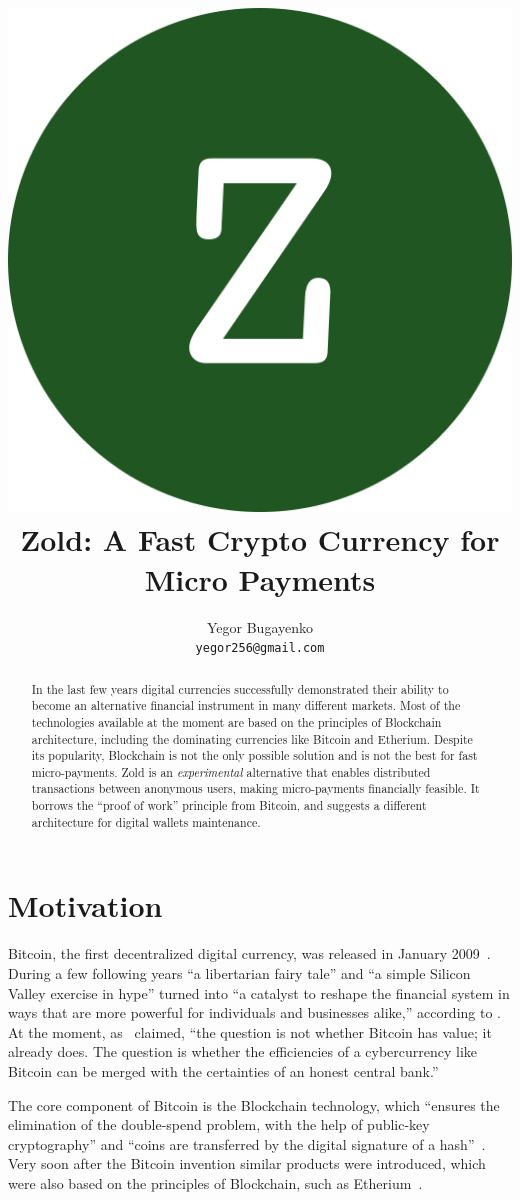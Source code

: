 \documentclass[11pt,oneside]{article}
\title{\includegraphics[scale=0.05]{logo.png}\\Zold: A Fast Crypto Currency for Micro Payments}
\author{Yegor Bugayenko\\\texttt{yegor256@gmail.com}}
\begin{document}
\raggedbottom

\maketitle
\begin{abstract}
In the last few years digital currencies successfully demonstrated
their ability to become an alternative financial instrument in many
different markets. Most of the technologies available at the moment are
based on the principles of Blockchain architecture, including the
dominating currencies like Bitcoin and Etherium. Despite its
popularity, Blockchain is not the only possible solution and is not the best
for fast micro-payments.
Zold is an \emph{experimental} alternative that enables distributed transactions between
anonymous users, making micro-payments financially feasible.
It borrows the ``proof of work'' principle from Bitcoin,
and suggests a different architecture for digital wallets maintenance.
\end{abstract}

\section{Motivation}

Bitcoin, the first decentralized digital currency, was released in January 2009~\parencite{nakamoto2008}.
During a few following years ``a libertarian fairy tale'' and ``a simple Silicon Valley exercise in hype''
turned into ``a catalyst to reshape the financial system in ways that are more
powerful for individuals and businesses alike,'' according to \textcite{andreessen2014}.
At the moment, as~\textcite{van2014} claimed, ``the question is not whether Bitcoin has value; it already does.
The question is whether the efficiencies of a cybercurrency
like Bitcoin can be merged with the certainties of an honest central bank.''

The core component of Bitcoin is the Blockchain technology, which
``ensures the elimination of the double-spend problem, with the help
of public-key cryptography'' and ``coins are transferred by the
digital signature of a hash''~\parencite{pilkington2016}.
Very soon after the Bitcoin invention similar products were introduced,
which were also based on the principles of Blockchain, such as
Etherium~\parencite{buterin2013}.
\end{document}
